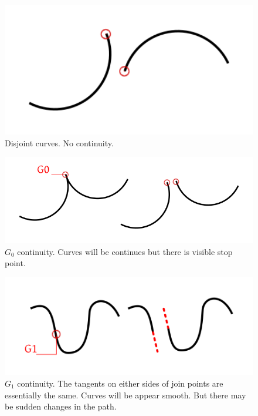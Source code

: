\documentclass[11pt,twoside,a4paper,parskip=half]{scrartcl}
\begin{document}
\begin{figure}[h!]
	\includegraphics[width=1.0\textwidth]{images/disjoint.png}
	\caption{Disjoint curves. No continuity.}
	\label{disjoint}
\end{figure}

\begin{figure}[h!]
	\includegraphics[width=1.0\textwidth]{images/g0.png}
	\caption{$G_0$ continuity. Curves will be continues but there is visible stop point.}
	\label{g0}
\end{figure}

\begin{figure}[h!]
	\includegraphics[width=1.0\textwidth]{images/g1.png}
	\caption{$G_1$ continuity. The tangents on either sides of join points are essentially the same. Curves will be appear smooth. But there may be sudden changes in the path.}
	\label{g1}
\end{figure}
\end{document}
